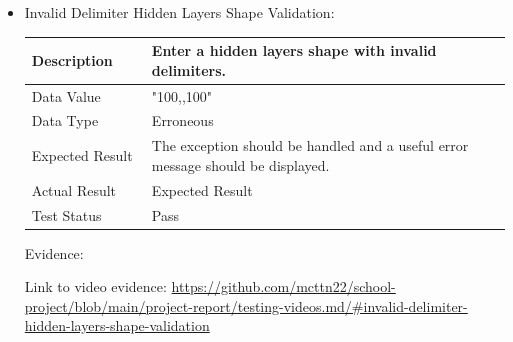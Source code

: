 \documentclass[./project-report/src/latex/project-report.tex]{subfiles}
\begin{document}
\begin{itemize}
\begin{itemize}
        \item Invalid Delimiter Hidden Layers Shape Validation: \newline\newline
			\begin{tabular}{|p{0.25\linewidth}|p{0.75\linewidth}|}
				\hline
				Description & Enter a hidden layers shape with invalid delimiters. \\
				\hline
				Data Value & "100,,100" \\
				\hline
				Data Type & Erroneous \\
				\hline
				Expected Result & The exception should be handled and a useful error message should be displayed. \\
				\hline
				Actual Result & Expected Result \\
				\hline
				Test Status & Pass \\
				\hline
			\end{tabular}

			\vspace{5mm}

			Evidence:
			\begin{figure}[h!]
			\centering
			\end{figure}

			\begin{sloppypar}
			Link to video evidence: \url{https://github.com/mcttn22/school-project/blob/main/project-report/testing-videos.md/#invalid-delimiter-hidden-layers-shape-validation}
			\end{sloppypar}
    \end{itemize}


\end{itemize}
\end{document}
